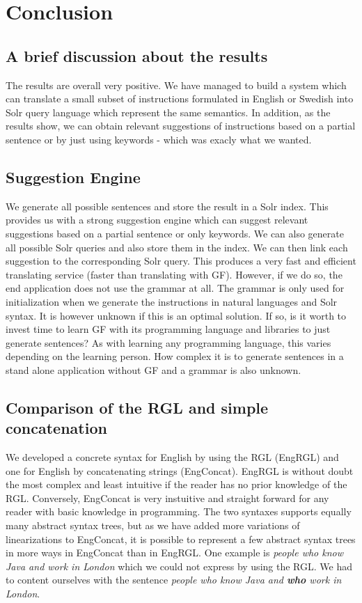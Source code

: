 \chapter{Conclusion}\label{ch:conclusion}
\section{A brief discussion about the results}
The results are overall very positive. We have managed to build a system which can translate a small subset of instructions formulated in English or Swedish into Solr query language which represent the same semantics. In addition, as the results show, we can obtain relevant suggestions of instructions based on a partial sentence or by just using keywords - which was exacly what we wanted.

\section{Suggestion Engine}
We generate all possible sentences and store the result in a Solr index. This provides us with a strong suggestion engine which can suggest relevant suggestions based on a partial sentence or only keywords. We can also generate all possible Solr queries and also store them in the index. We can then link each suggestion to the corresponding Solr query. This produces a very fast and efficient translating service (faster than translating with GF). However, if we do so, the end application does not use the grammar at all. The grammar is only used for initialization when we generate the instructions in natural languages and Solr syntax. It is however unknown if this is an optimal solution. If so, is it worth to invest time to learn GF with its programming language and libraries to just generate sentences? As with learning any programming language, this varies depending on the learning person. How complex it is to generate sentences in a stand alone application without GF and a grammar is also unknown.

\section{Comparison of the RGL and simple concatenation}\label{sec:comparison}
We developed a concrete syntax for English by using the RGL (EngRGL) and one for English by concatenating strings (EngConcat). EngRGL is without doubt the most complex and least intuitive if the reader has no prior knowledge of the RGL. Conversely, EngConcat is very instuitive and straight forward for any reader with basic knowledge in programming. The two syntaxes supports equally many abstract syntax trees, but as we have added more variations of linearizations to EngConcat, it is possible to represent a few abstract syntax trees in more ways in EngConcat than in EngRGL. One example is \emph{people who know Java and work in London} which we could not express by using the RGL. We had to content  ourselves with the sentence \emph{people who know Java and \textbf{who} work in London}.

